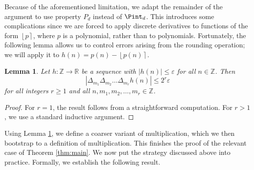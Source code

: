 \documentclass{amsart}
\newtheorem{lemma}[theorem]{Lemma}
\theoremstyle{definition}
\newcommand{\nint}[1]{\left\lfloor #1 \right\rceil}
\newcommand{\abs}[1]{\left|#1\right|}
\newcommand{\e}{\varepsilon}
\newcommand{\ZZ}{\mathbb{Z}}
\newcommand{\RR}{\mathbb{R}}
\begin{document}
Because of the aforementioned limitation, we adapt the remainder of the argument to use property $P_d$ instead of $\Pint_d$. This introduces some complications since we are forced to apply discrete derivatives to functions of the form $\nint{p}$, where $p$ is a polynomial, rather than to polynomials. Fortunately, the following lemma allows us to control errors arising from the rounding operation; we will apply it to $h(n) = p(n) - \nint{p(n)}$.
\begin{lemma}\label{lem:error-discr-der}
	Let $h \colon \ZZ \to \RR$ be a sequence with $\abs{h(n)} \leq \e$ for all $n \in \ZZ$. Then
	\[ 
	\abs{ \Delta_{m_1} \Delta_{m_2} \dots \Delta_{m_r} h(n)} \leq 2^r \e
	\]
	for all integers $r \geq 1$ and all $n,m_1,m_2,\dots,m_r \in \ZZ$. 
\end{lemma}
\begin{proof}
	For $r = 1$, the result follows from a straightforward computation. For $r > 1$, we use a standard inductive argument.
\end{proof}

Using Lemma \ref{lem:error-discr-der}, we define a coarser variant of multiplication, which we then bootstrap to a definition of multiplication. This finishes the proof of the relevant case of Theorem \ref{thm:main}. We now put the strategy discussed above into practice. Formally, we establish the following result.
\end{document}
